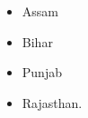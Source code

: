\documentclass[11pt,a4paper]{article}
\begin{document}
    \begin{itemize}
        \item Assam
        \item Bihar
        \item Punjab
        \item Rajasthan.
    \end{itemize}
\end{document}
